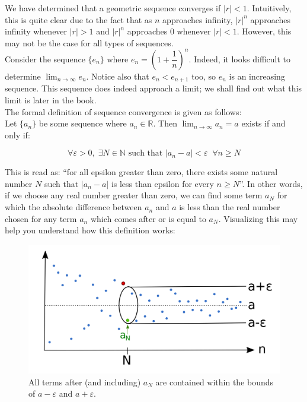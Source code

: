 \documentclass[12pt, a4paper, titlepage, twoside]{article}
\newcommand*{\N}{\mathbb{N}}
\newcommand*{\R}{\mathbb{R}}
\begin{document}
	\hfill
	
	\begin{fr}
		We have determined that a geometric sequence converges if $|r| < 1$. Intuitively, this is quite clear due to the fact that
		as $n$ approaches infinity, $|r|^n$ approaches infinity whenever $|r| > 1$ and $|r|^n$ approaches 0 whenever $|r| < 1$.
		However, this may not be the case for all types of sequences.\\
		
		Consider the sequence $\{e_n\}$ where $e_n = \left(1 + \dfrac{1}{n}\right)^n$. Indeed, it looks difficult to determine $\displaystyle
		\lim_{n \to \infty} e_n$. Notice also that $e_n < e_{n+1}$ too, so $e_n$ is an increasing sequence. This sequence does indeed
		approach a limit; we shall find out what this limit is later in the book.\\
		
		The formal definition of sequence convergence is given as follows:\\
		
		Let $\{a_n\}$ be some sequence where $a_n \in \R$. Then $\displaystyle \lim_{n \to \infty} a_n = a$ exists if and only if:
		
		$$\forall \varepsilon > 0, \; \exists N \in \N \text{ such that } |a_n - a| < \varepsilon \; \; \forall n \geqslant N$$

		\hfill		
		
		This is read as: ``for all epsilon greater than zero, there exists some natural number $N$ such that $|a_n - a|$ is less
		than epsilon for every $n \geqslant N$''. In other words, if we choose any real number greater than zero, we can find some
		term $a_N$ for which the absolute difference between $a_n$ and $a$ is less than the real number chosen for any term $a_n$
		which comes after or is equal to $a_N$. Visualizing this may help you understand how this definition works:\\
		
		\begin{figure}[H]
			\centering
			\includegraphics[width=12cm]{conv-seq.png}
			\caption*{All terms after (and including) $a_N$ are contained within the bounds of $a-\varepsilon$ and $a+\varepsilon$.}
		\end{figure}
	\end{fr}
	
\end{document}
